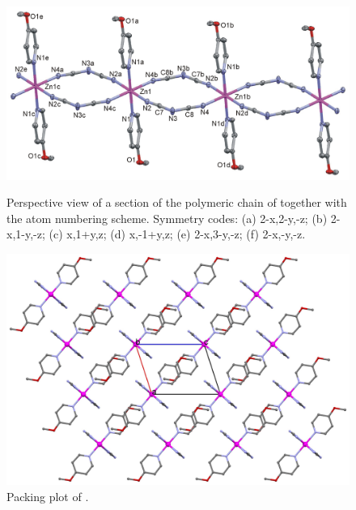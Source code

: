 \begin{figure}[!htpb]
\centering
\includegraphics[width=1\textwidth]{figures/ZnD_4MOP_FIGm11.png}
\caption[Perspective view of ]{Perspective view of a section of the polymeric chain of  together with the atom numbering scheme. Symmetry codes: (a) 2-x,2-y,-z; (b) 2-x,1-y,-z; (c) x,1+y,z; (d) x,-1+y,z; (e) 2-x,3-y,-z; (f) 2-x,-y,-z.}
\label{fig:ZnD4MOP_pv}
\vspace{\floatsep}
\includegraphics[width=1\textwidth]{figures/znd_4mop_CB.png}
\caption{Packing plot  of .}
\label{fig:ZnD4MOP_packv}
\end{figure}




